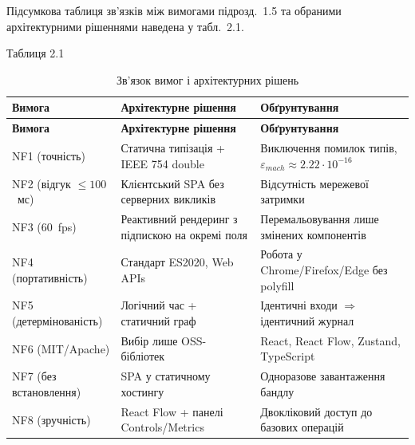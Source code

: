 \documentclass[
]{article}
\begin{document}
Підсумкова таблиця зв'язків між вимогами підрозд.~1.5 та обраними
архітектурними рішеннями наведена у табл.~2.1.

Таблиця 2.1

\begin{longtable}[]{@{}
  >{\raggedright\arraybackslash}p{}
  >{\raggedright\arraybackslash}p{}
  >{\raggedright\arraybackslash}p{}@{}}
\caption{Зв'язок вимог і архітектурних рішень}\tabularnewline
\toprule\noalign{}
\begin{minipage}[b]{\linewidth}\raggedright
\textbf{Вимога}
\end{minipage} & \begin{minipage}[b]{\linewidth}\raggedright
\textbf{Архітектурне рішення}
\end{minipage} & \begin{minipage}[b]{\linewidth}\raggedright
\textbf{Обґрунтування}
\end{minipage} \\
\midrule\noalign{}
\endfirsthead
\toprule\noalign{}
\begin{minipage}[b]{\linewidth}\raggedright
\textbf{Вимога}
\end{minipage} & \begin{minipage}[b]{\linewidth}\raggedright
\textbf{Архітектурне рішення}
\end{minipage} & \begin{minipage}[b]{\linewidth}\raggedright
\textbf{Обґрунтування}
\end{minipage} \\
\midrule\noalign{}
\endhead
\bottomrule\noalign{}
\endlastfoot
NF1 (точність) & Статична типізація + IEEE 754 double & Виключення
помилок типів, \(\varepsilon_{mach} \approx 2.22 \cdot 10^{- 16}\) \\
NF2 (відгук \(\leq 100\)~мс) & Клієнтський SPA без серверних викликів &
Відсутність мережевої затримки \\
NF3 (60~fps) & Реактивний рендеринг з підпискою на окремі поля &
Перемальовування лише змінених компонентів \\
NF4 (портативність) & Стандарт ES2020, Web APIs & Робота у
Chrome/Firefox/Edge без polyfill \\
NF5 (детермінованість) & Логічний час + статичний граф & Ідентичні входи
\(\Rightarrow\) ідентичний журнал \\
NF6 (MIT/Apache) & Вибір лише OSS-бібліотек & React, React Flow,
Zustand, TypeScript \\
NF7 (без встановлення) & SPA у статичному хостингу & Одноразове
завантаження бандлу \\
NF8 (зручність) & React Flow + панелі Controls/Metrics & Двокліковий
доступ до базових операцій \\
\end{longtable}
\end{document}
